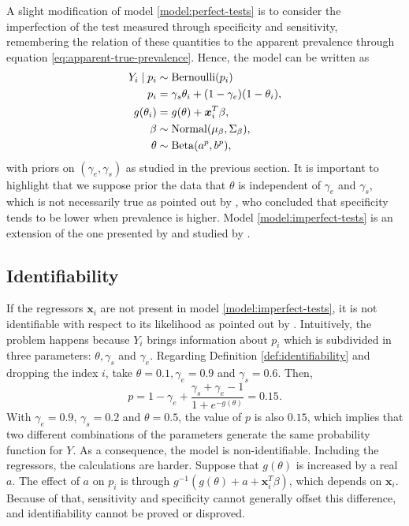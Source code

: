 A slight modification of model \eqref{model:perfect-tests} is to consider
the imperfection of the test measured through specificity and sensitivity,
remembering the relation of these quantities to the apparent prevalence
through equation \eqref{eq:apparent-true-prevalence}. Hence, the model can be
written as
\begin{equation}
  \label{model:imperfect-tests}
  \begin{aligned}
    Y_i \mid p_i & \sim \operatorname{Bernoulli}(p_i)                                  \\
    p_i          & = \gamma_s\theta_i + (1-\gamma_e)(1 - \theta_i), \\
    g(\theta_i)  & = g(\theta) + \boldsymbol{x}_i^T\beta,                       \\
    \beta        & \sim \operatorname{Normal}(\mu_{\beta}, \Sigma_{\beta}),            \\
    \theta       & \sim \operatorname{Beta}(a^p, b^p),
  \end{aligned}
\end{equation}
with priors on $(\gamma_e, \gamma_s)$ as studied in the previous section. It is
important to highlight that we suppose prior the data that $\theta$ is
independent of $\gamma_e$ and $\gamma_s$, which is not necessarily true as
pointed out by \textcite{leeflang2013variation}, who concluded that
specificity tends to be lower when prevalence is higher. Model \eqref{model:imperfect-tests}
is an extension of the one presented by \textcite{gelman2020bayesian} and
studied by \textcite{mcinturff2004modelling}.

\subsection{Identifiability}

If the regressors $\boldsymbol{x}_i$ are not present in model
\eqref{model:imperfect-tests}, it is not identifiable with respect to its
likelihood as pointed out by \textcite[p. 1271]{gelman2020bayesian}.
Intuitively, the problem happens because $Y_i$ brings information about
$p_i$ which is subdivided in three parameters: $\theta, \gamma_s$ and
$\gamma_e$. Regarding Definition \ref{def:identifiability} and dropping the
index $i$, take $\theta = 0.1, \gamma_e = 0.9$ and $\gamma_s = 0.6$. Then,
\begin{equation*}
  p = 1 - \gamma_e + \frac{\gamma_s + \gamma_e - 1}{1 + e^{-g(\theta)}} = 0.15.
\end{equation*}
With $\gamma_e = 0.9$, $\gamma_s = 0.2$ and $\theta = 0.5$, the value of $p$
is also $0.15$, which implies that two
different combinations of the parameters generate the same probability
function for $Y$. As a consequence, the model is non-identifiable. Including the
regressors, the calculations are harder. Suppose that $g(\theta)$
is increased by a real $a$. The effect of $a$ on $p_i$ is through
$g^{-1}(g(\theta) + a + \boldsymbol{x}_i^T\beta)$, which depends on
$\boldsymbol{x}_i$. Because of that, sensitivity and specificity cannot generally
offset this difference, and identifiability cannot be proved or disproved.

